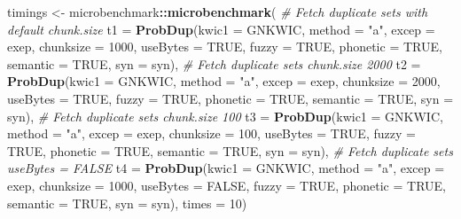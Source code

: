 \documentclass[
]{article}
\newenvironment{Shaded}{\begin{snugshade}}{\end{snugshade}}
\newcommand{\CommentTok}[1]{\textcolor[rgb]{0.56,0.35,0.01}{\textit{#1}}}
\newcommand{\DataTypeTok}[1]{\textcolor[rgb]{0.13,0.29,0.53}{#1}}
\newcommand{\DecValTok}[1]{\textcolor[rgb]{0.00,0.00,0.81}{#1}}
\newcommand{\KeywordTok}[1]{\textcolor[rgb]{0.13,0.29,0.53}{\textbf{#1}}}
\newcommand{\NormalTok}[1]{#1}
\newcommand{\OperatorTok}[1]{\textcolor[rgb]{0.81,0.36,0.00}{\textbf{#1}}}
\newcommand{\OtherTok}[1]{\textcolor[rgb]{0.56,0.35,0.01}{#1}}
\newcommand{\StringTok}[1]{\textcolor[rgb]{0.31,0.60,0.02}{#1}}
\begin{document}
\begin{Shaded}
\begin{Highlighting}[]
\NormalTok{timings <-}\StringTok{ }\NormalTok{microbenchmark}\OperatorTok{::}\KeywordTok{microbenchmark}\NormalTok{(}
  \CommentTok{# Fetch duplicate sets with default chunk.size}
  \DataTypeTok{t1 =} \KeywordTok{ProbDup}\NormalTok{(}\DataTypeTok{kwic1 =}\NormalTok{ GNKWIC, }\DataTypeTok{method =} \StringTok{"a"}\NormalTok{, }\DataTypeTok{excep =}\NormalTok{ exep,}
                                     \DataTypeTok{chunksize =} \DecValTok{1000}\NormalTok{, }\DataTypeTok{useBytes =} \OtherTok{TRUE}\NormalTok{,}
                                     \DataTypeTok{fuzzy =} \OtherTok{TRUE}\NormalTok{, }\DataTypeTok{phonetic =} \OtherTok{TRUE}\NormalTok{,}
                                     \DataTypeTok{semantic =} \OtherTok{TRUE}\NormalTok{, }\DataTypeTok{syn =}\NormalTok{ syn),}
  \CommentTok{# Fetch duplicate sets chunk.size 2000}
  \DataTypeTok{t2 =} \KeywordTok{ProbDup}\NormalTok{(}\DataTypeTok{kwic1 =}\NormalTok{ GNKWIC, }\DataTypeTok{method =} \StringTok{"a"}\NormalTok{, }\DataTypeTok{excep =}\NormalTok{ exep,}
                                     \DataTypeTok{chunksize =} \DecValTok{2000}\NormalTok{, }\DataTypeTok{useBytes =} \OtherTok{TRUE}\NormalTok{,}
                                     \DataTypeTok{fuzzy =} \OtherTok{TRUE}\NormalTok{, }\DataTypeTok{phonetic =} \OtherTok{TRUE}\NormalTok{,}
                                     \DataTypeTok{semantic =} \OtherTok{TRUE}\NormalTok{, }\DataTypeTok{syn =}\NormalTok{ syn),}
  \CommentTok{# Fetch duplicate sets chunk.size 100}
  \DataTypeTok{t3 =} \KeywordTok{ProbDup}\NormalTok{(}\DataTypeTok{kwic1 =}\NormalTok{ GNKWIC, }\DataTypeTok{method =} \StringTok{"a"}\NormalTok{, }\DataTypeTok{excep =}\NormalTok{ exep,}
                                     \DataTypeTok{chunksize =} \DecValTok{100}\NormalTok{, }\DataTypeTok{useBytes =} \OtherTok{TRUE}\NormalTok{,}
                                     \DataTypeTok{fuzzy =} \OtherTok{TRUE}\NormalTok{, }\DataTypeTok{phonetic =} \OtherTok{TRUE}\NormalTok{,}
                                     \DataTypeTok{semantic =} \OtherTok{TRUE}\NormalTok{, }\DataTypeTok{syn =}\NormalTok{ syn),}
  \CommentTok{# Fetch duplicate sets useBytes = FALSE}
  \DataTypeTok{t4 =} \KeywordTok{ProbDup}\NormalTok{(}\DataTypeTok{kwic1 =}\NormalTok{ GNKWIC, }\DataTypeTok{method =} \StringTok{"a"}\NormalTok{, }\DataTypeTok{excep =}\NormalTok{ exep,}
                                     \DataTypeTok{chunksize =} \DecValTok{1000}\NormalTok{, }\DataTypeTok{useBytes =} \OtherTok{FALSE}\NormalTok{,}
                                     \DataTypeTok{fuzzy =} \OtherTok{TRUE}\NormalTok{, }\DataTypeTok{phonetic =} \OtherTok{TRUE}\NormalTok{,}
                                     \DataTypeTok{semantic =} \OtherTok{TRUE}\NormalTok{, }\DataTypeTok{syn =}\NormalTok{ syn), }\DataTypeTok{times =} \DecValTok{10}\NormalTok{)}
\end{Highlighting}
\end{Shaded}
\end{document}
